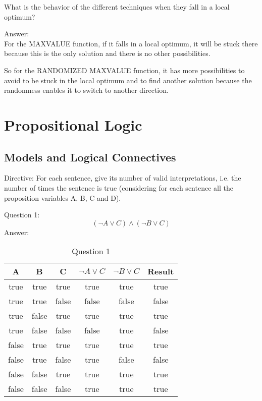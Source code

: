 \documentclass[12pt, a4paper]{report}
\begin{document}
What is the behavior of the different techniques when they fall in a local optimum?

Answer: \\
For the MAXVALUE function, if it falls in a local optimum, it will be stuck there because this is the only solution and there is no other possibilities. 

So for the RANDOMIZED MAXVALUE function, it has more possibilities to avoid to be stuck in the local optimum and to find another solution because the randomness enables it to switch to another direction.

\chapter{Propositional Logic}
\section{Models and Logical Connectives}
Directive: For each sentence, give its number of valid interpretations, i.e. the number of times the sentence is true (considering for each sentence all the proposition variables A, B, C and D).

Question 1:
\begin{equation}
    (\neg A \vee C) \wedge (\neg B \vee C)
\end{equation}
Answer:
\begin{table}[h]
    \centering
    \caption{Question 1}
    \begin{tabular}{|c|c|c|c|c|c|}
    \hline
    A & B & C & $\neg A \vee C$ & $\neg B \vee C$ & Result \\
    \hline
    true & true & true & true & true & true \\
    \hline
    true & true & false & false & false & false \\
    \hline
    true & false & true & true & true & true \\
    \hline
    true & false & false & false & true & false \\
    \hline
    false & true & true & true & true & true \\
    \hline
    false & true & false & true & false & false \\
    \hline
    false & false & true & true & true & true \\
    \hline
    false & false & false & true & true & true \\
    \hline
    \end{tabular}
\end{table}
\end{document}
